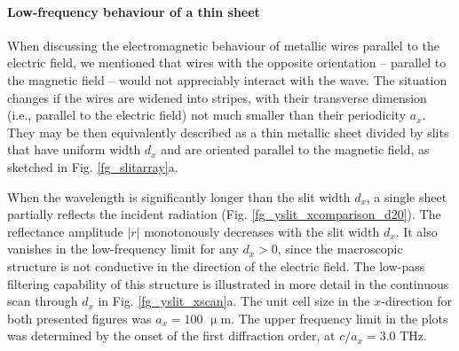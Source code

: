 \paragraph{Low-frequency behaviour of a thin sheet}%
When discussing the electromagnetic behaviour of metallic wires parallel to the electric field, we mentioned that wires with the opposite orientation -- parallel to the magnetic field -- would not appreciably interact with the wave. The situation changes if the wires are widened into stripes, with their transverse dimension (i.e., parallel to the electric field) not much smaller than their periodicity $a_x$. They may be then equivalently described as a thin metallic sheet divided by slits that have uniform width $d_x$ and are oriented parallel to the magnetic field, as sketched in Fig. \ref{fg_slitarray}a.

When the wavelength is significantly longer than the slit width $d_x$, a single sheet partially reflects the incident radiation (Fig. \ref{fg_yslit_xcomparison_d20}). The reflectance amplitude $|r|$ mono\-to\-nously decreases with the slit width $d_x$.  It also vanishes in the low-frequency limit for any $d_x>0$, since the macroscopic structure is not conductive in the direction of the electric field.  The low-pass filtering capability of this structure is illustrated in more detail in the continuous scan through $d_x$ in Fig. \ref{fg_yslit_xscan}a. 
The unit cell size in the $x$-direction for both presented figures was $a_x = 100$ $\upmu$m. 
The upper frequency limit in the plots was determined by the onset of the first diffraction order, at $c/a_x = 3.0$ THz. 

